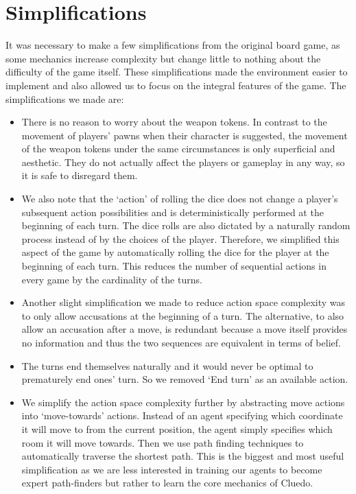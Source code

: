 \documentclass[msc, deptreport, ai, romanprepages]{infthesis}
\begin{document}
\section{Simplifications}
It was necessary to make a few simplifications from the original board game, as some mechanics increase complexity but change little to nothing about the difficulty of the game itself. These simplifications made the environment easier to implement and also allowed us to focus on the integral features of the game. The simplifications we made are:
\begin{itemize}
\item There is no reason to worry about the weapon tokens. In contrast to the movement of players’ pawns when their character is suggested, the movement of the weapon tokens under the same circumstances is only superficial and aesthetic. They do not actually affect the players or gameplay in any way, so it is safe to disregard them. 
\item We also note that the `action' of rolling the dice does not change a player’s subsequent action possibilities and is deterministically performed at the beginning of each turn. The dice rolls are also dictated by a naturally random process instead of by the choices of the player. Therefore, we simplified this aspect of the game by automatically rolling the dice for the player at the beginning of each turn. This reduces the number of sequential actions in every game by the cardinality of the turns.
\item Another slight simplification we made to reduce action space complexity was to only allow accusations at the beginning of a turn. The alternative, to also allow an accusation after a move, is redundant because a move itself provides no information and thus the two sequences are equivalent in terms of belief.
\item The turns end themselves naturally and it would never be optimal to prematurely end ones’ turn. So we removed `End turn' as an available action.
\item We simplify the action space complexity further by abstracting move actions into `move-towards' actions. Instead of an agent specifying which coordinate it will move to from the current position, the agent simply specifies which room it will move towards. Then we use path finding techniques to automatically traverse the shortest path. This is the biggest and most useful simplification as we are less interested in training our agents to become expert path-finders but rather to learn the core mechanics of Cluedo.

\end{itemize}
\end{document}
